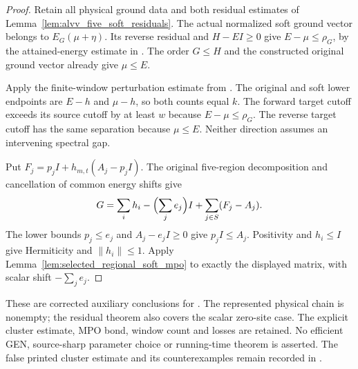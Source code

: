 \begin{proof}\leanok
    Retain all physical ground data and both residual estimates of
    Lemma~\ref{lem:alvv_five_soft_residuals}.
    The actual normalized soft ground vector belongs to
    $E_G(\mu+\eta)$. Its reverse residual and $H-EI\geq0$ give
    $E-\mu\leq\rho_G$, by the attained-energy estimate in
    \cite[``Attained energies from restricted residuals'']{QICLean2026Blueprint}.
    The order $G\leq H$ and the constructed original ground vector
    already give $\mu\leq E$.

    Apply the finite-window perturbation estimate from
    \cite[``Spectral comparison with a derived ground-energy shift'']{QICLean2026Blueprint}.
    The original and soft lower endpoints are $E-h$ and $\mu-h$,
    so both counts equal $k$. The forward target cutoff exceeds its
    source cutoff by at least $w$ because $E-\mu\leq\rho_G$.
    The reverse target cutoff has the same separation because
    $\mu\leq E$. Neither direction assumes an intervening spectral gap.

    Put $F_j=p_jI+h_{m,t}(A_j-p_jI)$. The original five-region
    decomposition and cancellation of common energy shifts give
    \begin{align}
        G=\sum_i h_i-\Bigl(\sum_j e_j\Bigr)I
        +\sum_{j\in S}(F_j-A_j).
    \end{align}
    The lower bounds $p_j\leq e_j$ and $A_j-e_jI\geq0$ give
    $p_jI\leq A_j$. Positivity and $h_i\leq I$ give Hermiticity and
    $\|h_i\|\leq1$. Apply
    Lemma~\ref{lem:selected_regional_soft_mpo} to exactly the displayed
    matrix, with scalar shift $-\sum_j e_j$.
\end{proof}

These are corrected auxiliary conclusions for
\cite[lines 1373--1392]{Arad2016RigorousRG}.
The represented physical chain is nonempty; the residual theorem also
covers the scalar zero-site case. The explicit cluster estimate,
MPO bond, window count and losses are retained. No efficient GEN,
source-sharp parameter choice or running-time theorem is asserted.
The false printed cluster estimate and its counterexamples remain
recorded in \cite{gap:alvv16_cluster_approximation}.

